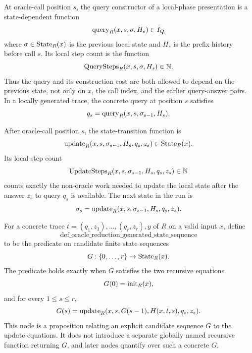 \begin{definition}
  \label{def:oracle-reduction-query-construction}
  At oracle-call position $s$, the query constructor of a local-phase
  presentation is a state-dependent function
  \[
    \operatorname{query}_R(x,s,\sigma,H_s)\in I_Q
  \]
  where $\sigma\in\operatorname{State}_R(x)$ is the previous local state and $H_s$ is the
  prefix history before call $s$.  Its local step count is the function
  \[
    \operatorname{QuerySteps}_R(x,s,\sigma,H_s)\in\mathbb{N} .
  \]
  Thus the query and its construction cost are both allowed to depend on the
  previous state, not only on $x$, the call index, and the earlier
  query-answer pairs.  In a locally generated trace, the concrete query at
  position $s$ satisfies
  \[
    q_s=\operatorname{query}_R(x,s,\sigma_{s-1},H_s).
  \]
\end{definition}

\begin{definition}
  \label{def:oracle-reduction-state-update}
  After oracle-call position $s$, the state-transition function is
  \[
    \operatorname{update}_R(x,s,\sigma_{s-1},H_s,q_s,z_s)\in\operatorname{State}_R(x).
  \]
  Its local step count
  \[
    \operatorname{UpdateSteps}_R(x,s,\sigma_{s-1},H_s,q_s,z_s)\in\mathbb{N}
  \]
  counts exactly the non-oracle work needed to update the local state after the
  answer $z_s$ to query $q_s$ is available.  The next state in the run is
  \[
    \sigma_s=\operatorname{update}_R(x,s,\sigma_{s-1},H_s,q_s,z_s).
  \]
\end{definition}

\begin{definition}
  \label{def:oracle-reduction-generated-state-sequence}
  For a concrete trace
  $t=(q_1,z_1),\ldots,(q_r,z_r),y$ of $R$ on a valid input $x$, define
  \[
    \operatorname{def\_oracle\_reduction\_generated\_state\_sequence}
  \]
  to be the predicate on candidate finite state sequences
  \[
    G:\{0,\ldots,r\}\to\operatorname{State}_R(x).
  \]
  The predicate holds exactly when $G$ satisfies the two recursive equations
  \[
    G(0)=\operatorname{init}_R(x),
  \]
  and for every $1\leq s\leq r$,
  \[
    G(s)=\operatorname{update}_R(x,s,G(s-1),H(x,t,s),q_s,z_s).
  \]
  This node is a proposition relating an explicit candidate sequence $G$ to
  the update equations.  It does not introduce a separate globally named
  recursive function returning $G$, and later nodes quantify over such a
  concrete $G$.
\end{definition}

